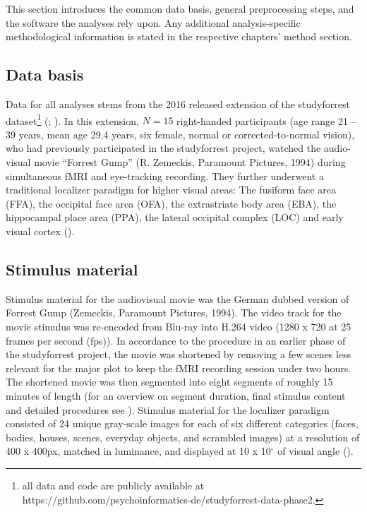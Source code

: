 \documentclass[a4paper, 12pt]{scrreprt}
\begin{document}
This section introduces the common data basis, general preprocessing steps, and the software the analyses rely upon. Any additional analysis-specific methodological information is stated in the respective chapters' method section.

\subsection{Data basis}

Data for all analyses stems from the 2016 released extension of the studyforrest dataset\footnote{all data and code are publicly available at https://github.com/psychoinformatics-de/studyforrest-data-phase2.} (\cite{hanke2016studyforrest}; \cite{sengupta2016studyforrest}). In this extension, $N = 15$ right-handed participants (age range 21 – 39 years, mean age 29.4 years, six female, normal or corrected-to-normal vision), who had previously participated in the studyforrest project, watched the audio-visual movie “Forrest Gump” (R. Zemeckis, Paramount Pictures, 1994) during simultaneous fMRI and eye-tracking recording. They further underwent a traditional localizer paradigm for higher visual areas: The fusiform face area (FFA), the occipital face area (OFA), the extrastriate body area (EBA), the hippocampal place area (PPA), the lateral occipital complex (LOC) and early visual cortex (\cite{sengupta2016studyforrest}).

\subsection{Stimulus material}

Stimulus material for the audiovisual movie was the German dubbed version of Forrest Gump (Zemeckis, Paramount Pictures, 1994). The video track for the movie stimulus was re-encoded from Blu-ray into H.264 video (1280 x 720 at 25 frames per second (fps)). In accordance to the procedure in an earlier phase of the studyforrest project, the movie was shortened by removing a few scenes less relevant for the major plot to keep the fMRI recording session under two hours. The shortened movie was then segmented into eight segments of roughly 15 minutes of length (for an overview on segment duration, final stimulus content and detailed procedures see \textcite{hanke2014high}). Stimulus material for the localizer paradigm consisted of 24 unique gray-scale images for each of six different categories (faces, bodies, houses, scenes, everyday objects, and scrambled images) at a resolution of 400 x 400px, matched in luminance, and displayed at 10 x 10$^\circ$ of visual angle (\cite{sengupta2016studyforrest}). 
\end{document}
